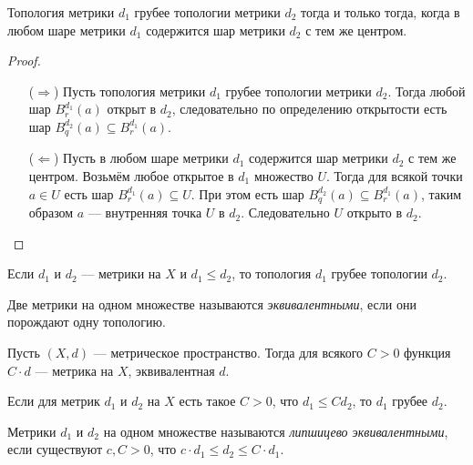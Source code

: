 \documentclass[12pt,a4paper]{article}
\begin{document}
    \begin{theorem}\label{metric_generated_topologies_comparation_theorem}
        Топология метрики $d_1$ грубее топологии метрики $d_2$ тогда и только тогда, когда в любом шаре метрики $d_1$ содержится шар метрики $d_2$ с тем же центром.
    \end{theorem}

    \begin{proof}
        \begin{itemize}
            \item[($\Rightarrow$)] Пусть топология метрики $d_1$ грубее топологии метрики $d_2$. Тогда любой шар $B_r^{d_1}(a)$ открыт в $d_2$, следовательно по определению открытости есть шар $B_q^{d_2}(a) \subseteq B_r^{d_1}(a)$.
            \item[($\Leftarrow$)] Пусть в любом шаре метрики $d_1$ содержится шар метрики $d_2$ с тем же центром. Возьмём любое открытое в $d_1$ множество $U$. Тогда для всякой точки $a \in U$ есть шар $B_r^{d_1}(a) \subseteq U$. При этом есть шар $B_q^{d_2}(a) \subseteq B_r^{d_1}(a)$, таким образом $a$ --- внутренняя точка $U$ в $d_2$. Следовательно $U$ открыто в $d_2$.
        \end{itemize}
    \end{proof}

    \begin{corollary}
        Если $d_1$ и $d_2$ --- метрики на $X$ и $d_1 \leqslant d_2$, то топология $d_1$ грубее топологии $d_2$. 
    \end{corollary}

    \begin{definition}
        Две метрики на одном множестве называются \emph{эквивалентными}, если они порождают одну топологию.
    \end{definition}

    \begin{lemma}
        Пусть $(X, d)$ --- метрическое пространство. Тогда для всякого $C > 0$ функция $C \cdot d$ --- метрика на $X$, эквивалентная $d$. 
    \end{lemma}

    \begin{corollary}
        Если для метрик $d_1$ и $d_2$ на $X$ есть такое $C > 0$, что $d_1 \leqslant C d_2$, то $d_1$ грубее $d_2$.
    \end{corollary}

    \begin{definition}
        Метрики $d_1$ и $d_2$ на одном множестве называются \emph{липшицево эквивалентными}, если существуют $c, C > 0$, что $c \cdot d_1 \leqslant d_2 \leqslant C \cdot d_1$.
    \end{definition}
\end{document}
